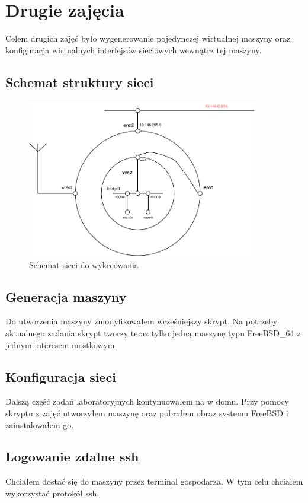 \documentclass{mwart}
\begin{document}
\newpage
\section{Drugie zajęcia}
Celem drugich zajęć było wygenerowanie pojedynczej wirtualnej maszyny oraz konfiguracja wirtualnych interfejsów sieciowych wewnątrz tej maszyny.

\subsection{Schemat struktury sieci}
\begin{figure}[H]
  \includegraphics[width=0.90\textwidth]{schemat2}
  \centering
  \caption{Schemat sieci do wykreowania}
  \label{fig:schemat}
\end{figure}

\subsection{Generacja maszyny}
Do utworzenia maszyny zmodyfikowałem wcześniejszy skrypt. Na potrzeby aktualnego zadania skrypt tworzy teraz tylko jedną maszynę typu FreeBSD\_64 z jednym interesem mostkowym.

\subsection{Konfiguracja sieci}
Dalszą część zadań laboratoryjnych kontynuowałem na w domu. Przy pomocy skryptu z zajęć utworzyłem maszynę oraz pobrałem obraz systemu FreeBSD i zainstalowałem go.

\subsection{Logowanie zdalne ssh}
Chciałem dostać się do maszyny przez terminal gospodarza. W tym celu chciałem wykorzystać protokół ssh.
\end{document}
